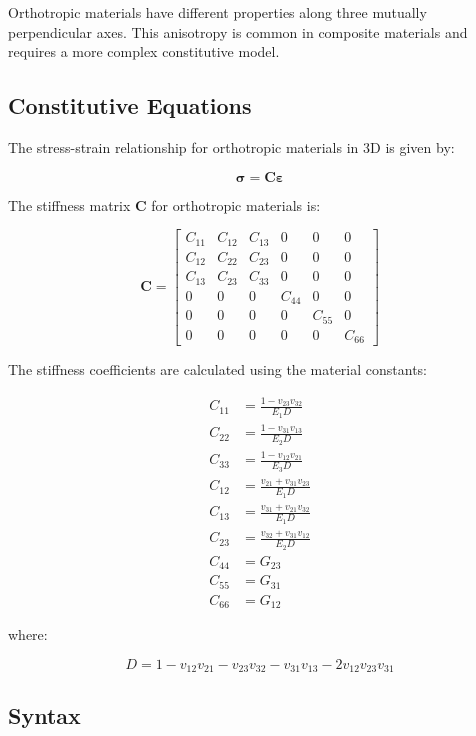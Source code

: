 Orthotropic materials have different properties along three mutually perpendicular axes. This anisotropy is common in composite materials and requires a more complex constitutive model.

\subsection{Constitutive Equations}

The stress-strain relationship for orthotropic materials in 3D is given by:

\[
\boldsymbol{\sigma} = \mathbf{C} \boldsymbol{\varepsilon}
\]

The stiffness matrix $\mathbf{C}$ for orthotropic materials is:

\[
\mathbf{C} =
\begin{bmatrix}
C_{11} & C_{12} & C_{13} & 0      & 0      & 0 \\
C_{12} & C_{22} & C_{23} & 0      & 0      & 0 \\
C_{13} & C_{23} & C_{33} & 0      & 0      & 0 \\
0      & 0      & 0      & C_{44} & 0      & 0 \\
0      & 0      & 0      & 0      & C_{55} & 0 \\
0      & 0      & 0      & 0      & 0      & C_{66}
\end{bmatrix}
\]

The stiffness coefficients are calculated using the material constants:

\[
\begin{aligned}
C_{11} &= \frac{1 - v_{23} v_{32}}{E_1 D} \\
C_{22} &= \frac{1 - v_{31} v_{13}}{E_2 D} \\
C_{33} &= \frac{1 - v_{12} v_{21}}{E_3 D} \\
C_{12} &= \frac{v_{21} + v_{31} v_{23}}{E_1 D} \\
C_{13} &= \frac{v_{31} + v_{21} v_{32}}{E_1 D} \\
C_{23} &= \frac{v_{32} + v_{31} v_{12}}{E_2 D} \\
C_{44} &= G_{23} \\
C_{55} &= G_{31} \\
C_{66} &= G_{12}
\end{aligned}
\]

where:

\[
D = 1 - v_{12} v_{21} - v_{23} v_{32} - v_{31} v_{13} - 2 v_{12} v_{23} v_{31}
\]

\subsection{Syntax}

